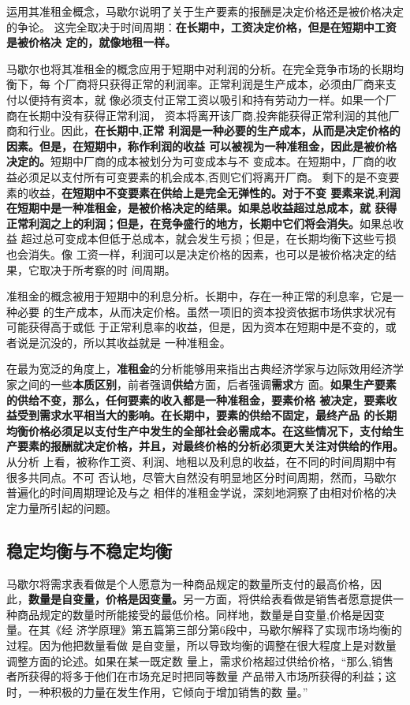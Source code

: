 运用其准租金概念，马歇尔说明了关于生产要素的报酬是决定价格还是被价格决定的争论。
这完全取决于时间周期：\textbf{在长期中，工资决定价格，但是在短期中工资是被价格决
  定的，就像地租一样。}

马歇尔也将其准租金的概念应用于短期中对利润的分析。在完全竞争市场的长期均衡下，每
个厂商将只获得正常的利润率。正常利润是生产成本，必须由厂商来支付以便持有资本，就
像必须支付正常工资以吸引和持有劳动力一样。如果一个厂商在长期中没有获得正常利润，
资本将离开该厂商,投奔能获得正常利润的其他厂商和行业。因此，\textbf{在长期中,正常
  利润是一种必要的生产成本，从而是决定价格的因素。但是，在短期中，称作利润的收益
  可以被视为一种准租金，因此是被价格决定的。}短期中厂商的成本被划分为可变成本与不
变成本。在短期中，厂商的收益必须足以支付所有可变要素的机会成本,否则它们将离开厂商。
剩下的是不变要素的收益，\textbf{在短期中不变要素在供给上是完全无弹性的。对于不变
  要素来说,利润在短期中是一种准租金，是被价格决定的结果。如果总收益超过总成本，就
  获得正常利润之上的利润；但是，在竞争盛行的地方，长期中它们将会消失。}如果总收益
超过总可变成本但低于总成本，就会发生亏损；但是，在长期均衡下这些亏损也会消失。像
工资一样，利润可以是决定价格的因素，也可以是被价格决定的结果，它取决于所考察的时
间周期。

准租金的概念被用于短期中的利息分析。长期中，存在一种正常的利息率，它是一种必要
的生产成本，从而决定价格。虽然一项旧的资本投资依据市场供求状况有可能获得高于或低
于正常利息率的收益，但是，因为资本在短期中是不变的，或者说是沉没的，所以其收益就是
一种准租金。

在最为宽泛的角度上，\textbf{准租金}的分析能够用来指出古典经济学家与边际效用经济学
家之间的一些\textbf{本质区别}，前者强调\textbf{供给}方面，后者强调\textbf{需求}方
面。\textbf{如果生产要素的供给不变，那么，任何要素的收入都是一种准租金，要素价格
  被决定，要素收益受到需求水平相当大的影响。在长期中，要素的供给不固定，最终产品
  的长期均衡价格必须足以支付生产中发生的全部社会必需成本。在这些情况下，支付给生
  产要素的报酬就决定价格，并且，对最终价格的分析必须更大关注对供给的作用。}从分析
上看，被称作工资、利润、地租以及利息的收益，在不同的时间周期中有很多共同点。不可
否认地，尽管大自然没有明显地区分时间周期，然而，马歇尔普遍化的时间周期理论及与之
相伴的准租金学说，深刻地洞察了由相对价格的决定力量所引起的问题。

\subsection{稳定均衡与不稳定均衡}

马歇尔将需求表看做是个人愿意为一种商品规定的数量所支付的最高价格，因
此，\textbf{数量是自变量，价格是因变量。}另一方面，将供给表看做是销售者愿意提供一
种商品规定的数量时所能接受的最低价格。同样地，数量是自变量,价格是因变量。在其《经
济学原理》第五篇第三部分第6段中，马歇尔解释了实现市场均衡的过程。因为他把数量看做
是自变量，所以导致均衡的调整在很大程度上是对数量调整方面的论述。如果在某一既定数
量上，需求价格超过供给价格，“那么,销售者所获得的将多于他们在市场充足时把同等数量
产品带入市场所获得的利益；这时，一种积极的力量在发生作用，它倾向于增加销售的数
量。”


